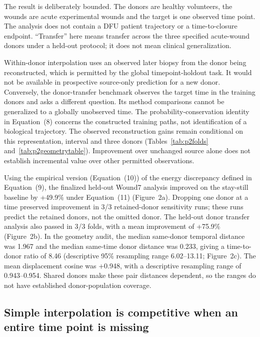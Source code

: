 \documentclass[10pt,a4paper]{article}
\begin{document}
The result is deliberately bounded. The donors are healthy volunteers, the wounds are acute experimental wounds and the target is one observed time point. The analysis does not contain a DFU patient trajectory or a time-to-closure endpoint. ``Transfer'' here means transfer across the three specified acute-wound donors under a held-out protocol; it does not mean clinical generalization.

Within-donor interpolation uses an observed later biopsy from the donor being reconstructed, which is permitted by the global timepoint-holdout task. It would not be available in prospective source-only prediction for a new donor. Conversely, the donor-transfer benchmark observes the target time in the training donors and asks a different question. Its method comparisons cannot be generalized to a globally unobserved time. The probability-conservation identity in Equation~(8) concerns the constructed training paths, not identification of a biological trajectory. The observed reconstruction gains remain conditional on this representation, interval and three donors (Tables~\ref{tab:p2folds} and~\ref{tab:p2geometrytable}). Improvement over unchanged source alone does not establish incremental value over other permitted observations.

\FloatBarrier
Using the empirical version (Equation~(10)) of the energy discrepancy defined in Equation~(9), the finalized held-out Wound7 analysis improved on the stay-still baseline by +49.9\% under Equation~(11) (Figure~2a\label{call:p2f2}). Dropping one donor at a time preserved improvement in 3/3 retained-donor sensitivity runs; these runs predict the retained donors, not the omitted donor. The held-out donor transfer analysis also passed in 3/3 folds, with a mean improvement of +75.9\% (Figure~2b). In the geometry audit, the median same-donor temporal distance was 1.967 and the median same-time donor distance was 0.233, giving a time-to-donor ratio of 8.46 (descriptive 95\% resampling range 6.02--13.11; Figure~2c). The mean displacement cosine was +0.948, with a descriptive resampling range of 0.943--0.954. Shared donors make these pair distances dependent, so the ranges do not have established donor-population coverage.




\subsection{Simple interpolation is competitive when an entire time point is missing}
\end{document}
